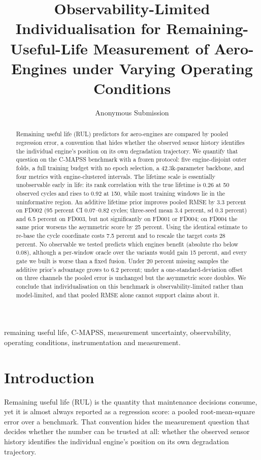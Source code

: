 \documentclass[journal]{IEEEtran}
\title{Observability-Limited Individualisation for Remaining-Useful-Life Measurement of Aero-Engines under Varying Operating Conditions}
\author{Anonymous Submission}
\begin{document}
\maketitle

\begin{abstract}
Remaining useful life (RUL) predictors for aero-engines are compared by pooled regression error, a convention that hides whether the observed sensor history identifies the individual engine's position on its own degradation trajectory. We quantify that question on the C-MAPSS benchmark with a frozen protocol: five engine-disjoint outer folds, a full training budget with no epoch selection, a 42.3k-parameter backbone, and four metrics with engine-clustered intervals. The lifetime scale is essentially unobservable early in life: its rank correlation with the true lifetime is 0.26 at 50 observed cycles and rises to 0.92 at 150, while most training windows lie in the uninformative region. An additive lifetime prior improves pooled RMSE by 3.3 percent on FD002 (95 percent CI 0.07--0.82 cycles; three-seed mean 3.4 percent, sd 0.3 percent) and 6.5 percent on FD003, but not significantly on FD001 or FD004; on FD004 the same prior worsens the asymmetric score by 25 percent. Using the identical estimate to re-base the cycle coordinate costs 7.5 percent and to rescale the target costs 28 percent. No observable we tested predicts which engines benefit (absolute rho below 0.08), although a per-window oracle over the variants would gain 15 percent, and every gate we built is worse than a fixed fusion. Under 20 percent missing samples the additive prior's advantage grows to 6.2 percent; under a one-standard-deviation offset on three channels the pooled error is unchanged but the asymmetric score doubles. We conclude that individualisation on this benchmark is observability-limited rather than model-limited, and that pooled RMSE alone cannot support claims about it.
\end{abstract}

\begin{IEEEkeywords}
remaining useful life, C-MAPSS, measurement uncertainty, observability, operating conditions, instrumentation and measurement.
\end{IEEEkeywords}

\section{Introduction}
Remaining useful life (RUL) is the quantity that maintenance decisions consume, yet it is almost always reported as a regression score: a pooled root-mean-square error over a benchmark. That convention hides the measurement question that decides whether the number can be trusted at all: whether the observed sensor history identifies the individual engine's position on its own degradation trajectory.
\end{document}
